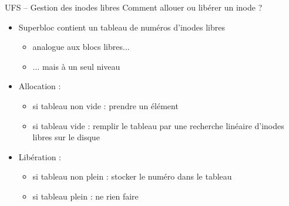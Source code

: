 \begin {frame} {UFS -- Gestion des inodes libres}
    Comment allouer ou libérer un inode ?

    \begin {itemize}
	\item Superbloc contient un tableau de numéros d'inodes libres
	    \begin {itemize}
		\item analogue aux blocs libres...
		\item ... mais à un seul niveau
	    \end {itemize}
	\item Allocation :
	    \begin {itemize}
		\item si tableau non vide : prendre un élément
		\item si tableau vide : remplir le tableau par une
		    recherche linéaire d'inodes libres sur le disque
	    \end {itemize}
	\item Libération :
	    \begin {itemize}
		\item si tableau non plein : stocker le numéro dans
		    le tableau
		\item si tableau plein : ne rien faire
	    \end {itemize}
    \end {itemize}
\end {frame}

